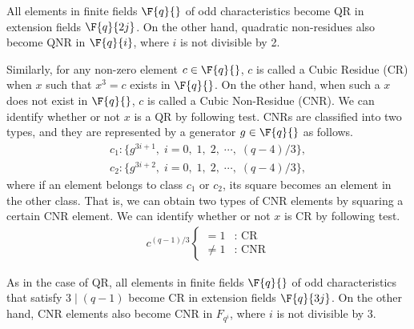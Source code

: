 All elements in finite fields $\F{q}{}$ of odd characteristics become QR in extension fields $\F{q}{2j}$.
On the other hand, quadratic non-residues also become QNR in $\F{q}{i}$, where $i$ is not divisible by 2.


Similarly, for any non-zero element $c\in\F{q}{}$, $c$ is called a Cubic Residue (CR) when $x$ such that $x^3=c$ exists in $\F{q}{}$.
On the other hand, when such a $x$ does not exist in $\F{q}{}$, $c$ is called a Cubic Non-Residue (CNR).
We can identify whether or not $x$ is a QR by following test.
CNRs are classified into two types, and they are represented by a generator $g \in \F{q}{}$ as follows.
\begin{subequations}
\begin{eqnarray}
c_1:	\{ g^{3i+1},\;i=0,\;1,\;2,\;\cdots,\;\left(q-4\right)/3 \}, \\
c_2:	\{ g^{3i+2},\;i=0,\;1,\;2,\;\cdots,\;\left(q-4\right)/3 \}, 
\end{eqnarray}
\end{subequations}
where if an element belongs to class $c_1$ or $c_2$, its square becomes an element in the other class. 
That is, we can obtain two types of CNR elements by squaring a certain CNR element.
We can identify whether or not $x$ is CR by following test.
\begin{eqnarray}
 c^{(q-1)/3} \left\{
			 \begin{array}{ll}
              = 1 	  & \mbox{: CR} \\
              \not= 1 & \mbox{: CNR}
             \end{array}
		     \right.
\end{eqnarray}

As in the case of QR, all elements in finite fields $\F{q}{}$ of odd characteristics that satisfy $3\mid \left(q-1\right)$ become CR in extension fields $\F{q}{3j}$.
On the other hand, CNR elements also become CNR in $F_{q^i}$, where $i$ is not divisible by 3.

